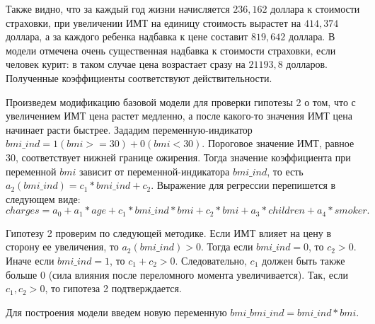 \documentclass[a4paper,12pt]{article}
\begin{document}
Также видно, что за каждый год жизни начисляется $236,162$ доллара к стоимости страховки, при увеличении ИМТ на единицу стоимость вырастет на $414,374$ доллара, а за каждого ребенка надбавка к цене составит $819,642$ доллара. В модели отмечена очень существенная надбавка к стоимости страховки, если человек курит: в таком случае цена возрастает сразу на $21193,8$ долларов. Полученные коэффициенты соответствуют действительности.

Произведем модификацию базовой модели для проверки гипотезы 2 о том, что с увеличением ИМТ цена растет медленно, а после какого-то значения ИМТ цена начинает расти быстрее. Зададим переменную-индикатор $bmi\_ind = 1 (bmi >= 30) + 0 (bmi < 30)$. Пороговое значение ИМТ, равное 30, соответствует нижней границе ожирения. Тогда значение коэффициента при переменной $bmi$ зависит от переменной-индикатора $bmi\_ind$, то есть $a_2(bmi\_ind) = c_1 * bmi\_ind + c_2$. Выражение для регрессии перепишется в следующем виде:
\[charges = a_0 + a_1 * age + c_1 * bmi\_ind * bmi + c_2 * bmi + a_3 * children + a_4 * smoker.\]

Гипотезу 2 проверим по следующей методике. Если ИМТ влияет на цену в сторону ее увеличения, то $a_2(bmi\_ind) > 0$. Тогда если $bmi\_ind = 0$, то $c_2 > 0$. Иначе если $bmi\_ind = 1$, то $c_1 + c_2 > 0$. Следовательно, $c_1$ должен быть также больше 0 (сила влияния после переломного момента увеличивается). Так, если $c_1, c_2 > 0$, то гипотеза 2 подтверждается.

Для построения модели введем новую переменную $bmi\_bmi\_ind = bmi\_ind * bmi$.
\end{document}
